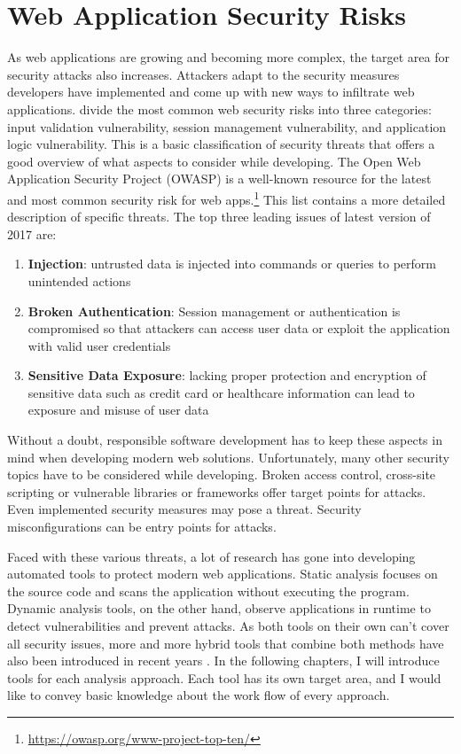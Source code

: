 \section{Web Application Security Risks}
As web applications are growing and becoming more complex, the target area for security attacks also increases. Attackers adapt to the security measures developers have implemented and come up with new ways to infiltrate web applications.\newline
\textcite[5]{Li2014} divide the most common web security risks into three categories: input validation vulnerability, session management vulnerability, and application logic vulnerability. This is a basic classification of security threats that offers a good overview of what aspects to consider while developing. The Open Web Application Security Project (OWASP) is a well-known resource for the latest and most common security risk for web apps.\footnote{ \url{https://owasp.org/www-project-top-ten/}} This list contains a more detailed description of specific threats. The top three leading issues of latest version of 2017 are: 

\begin{enumerate}
    \item \textbf{Injection}: untrusted data is injected into commands or queries to perform unintended actions
    \item \textbf{Broken Authentication}: Session management or authentication is compromised so that attackers can access user data or exploit the application with valid user credentials    
    \item \textbf{Sensitive Data Exposure}: lacking proper protection and encryption of sensitive data such as credit card or healthcare information can lead to exposure and misuse of user data
\end{enumerate}

Without a doubt, responsible software development has to keep these aspects in mind when developing modern web solutions. Unfortunately, many other security topics have to be considered while developing. Broken access control, cross-site scripting or vulnerable libraries or frameworks offer target points for attacks. Even implemented security measures may pose a threat. Security misconfigurations can be entry points for attacks.\newline

Faced with these various threats, a lot of research has gone into developing automated tools to protect modern web applications. Static analysis focuses on the source code and scans the application without executing the program. Dynamic analysis tools, on the other hand, observe applications in runtime to detect vulnerabilities and prevent attacks. As both tools on their own can't cover all security issues, more and more hybrid tools that combine both methods have also been introduced in recent years \autocite[]{Jahanshahi2018, Lam2008, Hosek2011}.\newline 
In the following chapters, I will introduce tools for each analysis approach. Each tool has its own target area, and I would like to convey basic knowledge about the work flow of every approach. 


